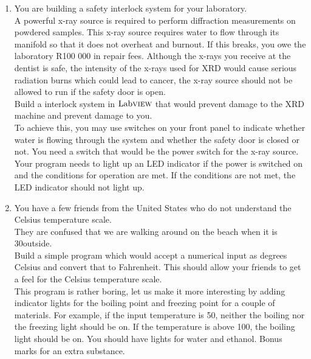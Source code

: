 	\begin{enumerate}
		\item You are building a safety interlock system for your laboratory.\\
		A powerful x-ray source is required to perform diffraction measurements on powdered samples. This x-ray source requires water to flow through its manifold so that it does not overheat and burnout. If this breaks, you owe the laboratory R100 000 in repair fees. Although the x-rays you receive at the dentist is safe, the intensity of the x-rays used for XRD would cause serious radiation burns which could lead to cancer, the x-ray source should not be allowed to run if the safety door is open.\\
		
		Build a interlock system in $\text{Lab}\textsc{view}$ that would prevent damage to the XRD machine and prevent damage to you.\\
		
		To achieve this, you may use switches on your front panel to indicate whether water is flowing through the system and whether the safety door is closed or not. You need a switch that would be the power switch for the x-ray source. Your program needs to light up an LED indicator if the power is switched on and the conditions for operation are met. If the conditions are not met, the LED indicator should not light up.
		
		\item You have a few friends from the United States who do not understand the Celsius temperature scale.\\
		They are confused that we are walking around on the beach when it is 30\textdegree outside.\\
		
		Build a simple program which would accept a numerical input as degrees Celsius and convert that to Fahrenheit. This should allow your friends to get a feel for the Celsius temperature scale.\\
		
		This program is rather boring, let us make it more interesting by adding indicator lights for the boiling point and freezing point for a couple of materials. For example, if the input temperature is 50\textdegree, neither the boiling nor the freezing light should be on. If the temperature is above 100\textdegree, the boiling light should be on. You should have lights for water and ethanol. Bonus marks for an extra substance.\\
	\end{enumerate}
	
	